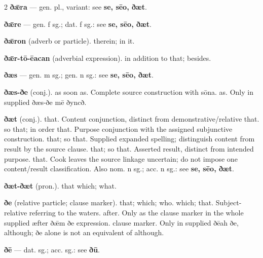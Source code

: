 \begin{multicols*}{2}
\textbf{ðǣra} — gen. pl., variant: see \textbf{se, sēo, ðæt}.\par
\textbf{ðǣre} — gen. f sg.; dat. f sg.: see \textbf{se, sēo, ðæt}.\par
\textbf{ðǣron} (adverb or particle). therein; in it.\par
\textbf{ðǣr-tō-ēacan} (adverbial expression). in addition to that; besides.\par
\textbf{ðæs} — gen. m sg.; gen. n sg.: see \textbf{se, sēo, ðæt}.\par
\textbf{ðæs-ðe} (conj.). as soon as. Complete source construction with sōna. as. Only in supplied ðæs-ðe mē ðyncð.\par
\textbf{ðæt} (conj.). that. Content conjunction, distinct from demonstrative/relative that. so that; in order that. Purpose conjunction with the assigned subjunctive construction. that; so that. Supplied expanded spelling; distinguish content from result by the source clause. that; so that. Asserted result, distinct from intended purpose. that. Cook leaves the source linkage uncertain; do not impose one content/result classification. Also nom. n sg.; acc. n sg.: see \textbf{se, sēo, ðæt}.\par
\textbf{ðæt-ðæt} (pron.). that which; what.\par
\textbf{ðe} (relative particle; clause marker). that; which; who. which; that. Subject-relative referring to the waters. after. Only as the clause marker in the whole supplied æfter ðǣm ðe expression. clause marker. Only in supplied ðēah ðe, although; ðe alone is not an equivalent of although.\par
\textbf{ðē} — dat. sg.; acc. sg.: see \textbf{ðū}.\par

\end{multicols*}
